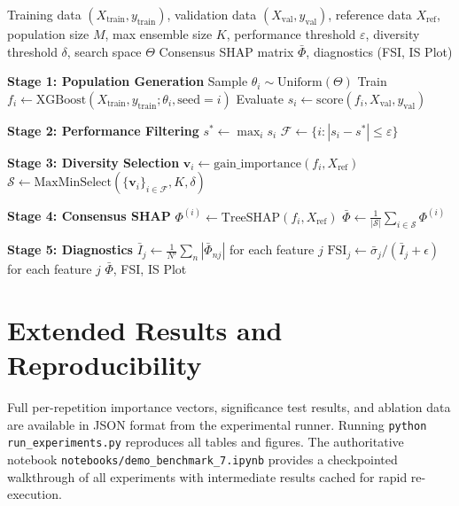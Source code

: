 \documentclass[11pt]{article}
\begin{document}
\begin{algorithm}[h]
\caption{DASH Pipeline}
\label{alg:dash}
\begin{algorithmic}[1]
\REQUIRE Training data $(X_{\text{train}}, y_{\text{train}})$, validation
  data $(X_{\text{val}}, y_{\text{val}})$, reference data $X_{\text{ref}}$,
  population size $M$, max ensemble size $K$, performance threshold
  $\varepsilon$, diversity threshold $\delta$, search space $\Theta$
\ENSURE Consensus SHAP matrix $\bar{\Phi}$, diagnostics (FSI, IS Plot)

\STATE \textbf{Stage 1: Population Generation}
  \STATE Sample $\theta_i \sim \text{Uniform}(\Theta)$
  \STATE Train $f_i \gets \text{XGBoost}(X_{\text{train}}, y_{\text{train}};
    \theta_i, \text{seed}=i)$
  \STATE Evaluate $s_i \gets \text{score}(f_i, X_{\text{val}}, y_{\text{val}})$
\ENDFOR

\STATE \textbf{Stage 2: Performance Filtering}
\STATE $s^* \gets \max_i s_i$
\STATE $\mathcal{F} \gets \{i : |s_i - s^*| \leq \varepsilon\}$

\STATE \textbf{Stage 3: Diversity Selection}
  \STATE $\mathbf{v}_i \gets \text{gain\_importance}(f_i, X_{\text{ref}})$
\ENDFOR
\STATE $\mathcal{S} \gets \text{MaxMinSelect}(\{\mathbf{v}_i\}_{i \in \mathcal{F}},
  K, \delta)$

\STATE \textbf{Stage 4: Consensus SHAP}
  \STATE $\Phi^{(i)} \gets \text{TreeSHAP}(f_i, X_{\text{ref}})$
\ENDFOR
\STATE $\bar{\Phi} \gets \frac{1}{|\mathcal{S}|} \sum_{i \in \mathcal{S}}
  \Phi^{(i)}$

\STATE \textbf{Stage 5: Diagnostics}
\STATE $\bar{I}_j \gets \frac{1}{N'}\sum_n |\bar{\Phi}_{nj}|$ for each
  feature $j$
\STATE $\text{FSI}_j \gets \bar{\sigma}_j / (\bar{I}_j + \epsilon)$ for
  each feature $j$
\RETURN $\bar{\Phi}$, FSI, IS Plot
\end{algorithmic}
\end{algorithm}

\section{Extended Results and Reproducibility}
\label{app:full_sweep}

Full per-repetition importance vectors, significance test results, and
ablation data are available in JSON format from the experimental runner.
Running \texttt{python run\_experiments.py} reproduces all tables and
figures. The authoritative notebook
\texttt{notebooks/demo\_benchmark\_7.ipynb} provides a checkpointed
walkthrough of all experiments with intermediate results cached for
rapid re-execution.
\end{document}
